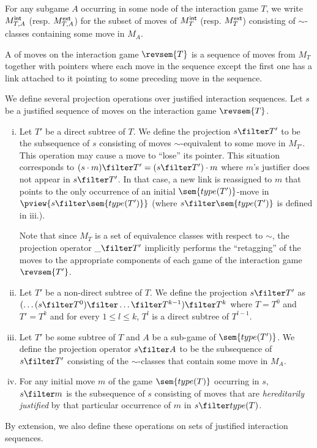 For any subgame $A$ occurring in some node of the interaction game $T$, we write $M_{T,A}^{\sf int}$ (resp. $M_{T,A}^{\sf ext}$) for the subset of moves of $M_T^{\sf int}$ (resp. $M_T^{\sf ext}$) consisting of $\sim$-classes containing some move in $M_A$.
\smallskip

A  of moves on the interaction game $\revsem{T}$ is a sequence of moves from $M_T$ together with pointers where each move in the sequence except the first one has a link attached to it pointing to some preceding move in the sequence.


\begin{definition}[Projection]
\label{def:sub_interstrat_projection}
We define several projection operations
over justified interaction sequences. Let $s$ be a justified
sequence of moves on the interaction game $\revsem{T}$.
\begin{enumerate}[i.]
\item  Let $T'$ be a direct subtree of $T$. We define the projection $s\filter T'$ to be the subsequence of $s$ consisting of moves $\sim$-equivalent to some move in $M_{T'}$. This operation may cause a move to ``lose'' its pointer. This situation corresponds to
    $(s \cdot m) \filter T' = (s \filter T') \cdot m$ where $m$'s justifier does not appear in $s \filter T'$.
    In that case, a new link is reassigned to $m$ that points to the only occurrence of an initial
    $\sem{type(T')}$-move in $\pview{s \filter \sem{type(T')}}$ (where $s \filter \sem{type(T')}$ is defined in iii.).

    Note that since $M_T$ is a set of equivalence classes with respect to $\sim$, the projection operator $\_ \filter T'$ implicitly performs the ``retagging'' of the moves to the appropriate components of each game of the interaction game $\revsem{T'}$.

\item  Let $T'$ be a non-direct subtree of $T$.
    We define the projection $s\filter T'$ as  $(\ldots (s\filter T^0) \filter \ldots \filter T^{k-1}) \filter T^k$
    where $T=T^0$ and $T'=T^k$ and for every $1\leq l \leq k$, $T^l$ is a direct subtree of $T^{l-1}$.

\item Let $T'$ be some subtree of $T$ and $A$ be a sub-game of $\sem{type(T')}$. We define the projection operator $s\filter A$ to be the subsequence of $s\filter T'$ consisting of the $\sim$-classes that contain some move in $M_A$.

\item For any initial move $m$ of the game $\sem{type(T)}$ occurring in $s$, $s \filter m$ is the subsequence of $s$ consisting of moves that are \emph{hereditarily justified} by that particular occurrence of $m$ in $s \filter type(T)$.
\end{enumerate}
By extension, we also define these operations on sets of justified interaction sequences.
\end{definition}


